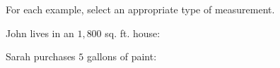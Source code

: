\documentclass{ximera}
\begin{document}

\begin{question}\label{q:lengthAreaVolume}
    For each example, select an appropriate type of measurement.

    John lives in an $1,800$ sq. ft. house: 

    Sarah purchases $5$ gallons of paint: 
\end{question}
\end{document}
